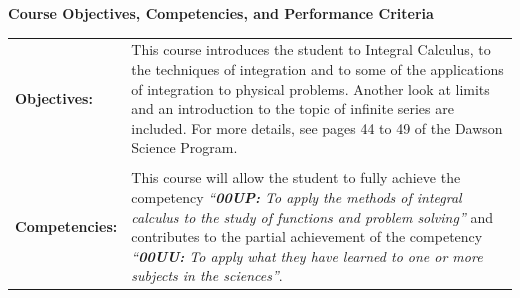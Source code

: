 \documentclass[10pt]{article}
\begin{document}
\large{\textbf{Course Objectives, Competencies, and Performance Criteria}}\\
\vspace{-0.15in}\hline \bigskip \normalsize
\begin{tabular}{@{}p{1.5in}p{4.7in}}
\textbf{Objectives:} &
This course introduces the student to Integral Calculus, to the techniques of integration and to some of the applications of integration to physical problems. Another look at limits and an introduction to the topic of infinite series are included.  For more details, see pages 44 to 49 of the Dawson Science Program. \\ \\
\textbf{Competencies:}&
This course will allow the student to fully achieve the competency
\textit{``{\textbf{00UP:} To apply the methods of integral calculus to the study of functions and problem solving''}}
and contributes to the partial achievement of the competency
\textit{``\textbf{00UU:} To apply what they have learned to one or more subjects in the sciences''}. \\
\end{tabular}
\end{document}
